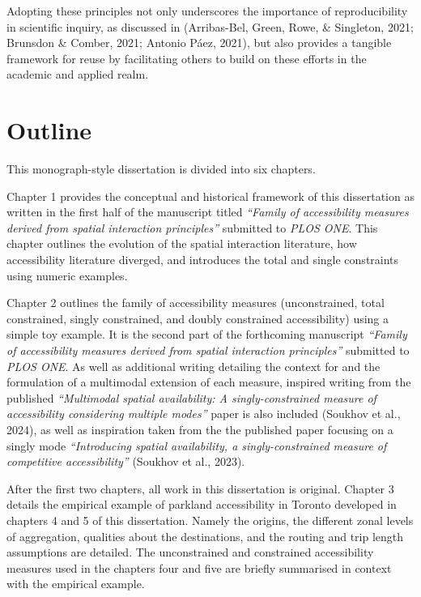 \documentclass[
11pt, %
oneside, %
english, %
singlespacing, %
]{macthesis} %
\begin{document}
Adopting these principles not only underscores the importance of reproducibility in scientific inquiry, as discussed in (Arribas-Bel, Green, Rowe, \& Singleton, 2021; Brunsdon \& Comber, 2021; Antonio Páez, 2021), but also provides a tangible framework for reuse by facilitating others to build on these efforts in the academic and applied realm.

\section{Outline}\label{outline}

This monograph-style dissertation is divided into six chapters.

Chapter 1 provides the conceptual and historical framework of this dissertation as written in the first half of the manuscript titled \emph{``Family of accessibility measures derived from spatial interaction principles''} submitted to \emph{PLOS ONE}. This chapter outlines the evolution of the spatial interaction literature, how accessibility literature diverged, and introduces the total and single constraints using numeric examples.

Chapter 2 outlines the family of accessibility measures (unconstrained, total constrained, singly constrained, and doubly constrained accessibility) using a simple toy example. It is the second part of the forthcoming manuscript \emph{``Family of accessibility measures derived from spatial interaction principles''} submitted to \emph{PLOS ONE}. As well as additional writing detailing the context for and the formulation of a multimodal extension of each measure, inspired writing from the published \emph{``Multimodal spatial availability: A singly-constrained measure of accessibility considering multiple modes''} paper is also included (Soukhov et al., 2024), as well as inspiration taken from the the published paper focusing on a singly mode \emph{``Introducing spatial availability, a singly-constrained measure of competitive accessibility''} (Soukhov et al., 2023).

After the first two chapters, all work in this dissertation is original.
Chapter 3 details the empirical example of parkland accessibility in Toronto developed in chapters 4 and 5 of this dissertation. Namely the origins, the different zonal levels of aggregation, qualities about the destinations, and the routing and trip length assumptions are detailed. The unconstrained and constrained accessibility measures used in the chapters four and five are briefly summarised in context with the empirical example.
\end{document}
